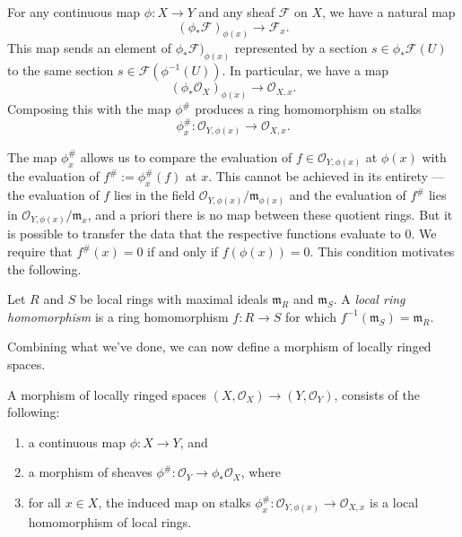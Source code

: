 For any continuous map \(\phi \colon X \to Y\) and any sheaf \(\mathcal{F}\) on \(X\), we have a natural map
\[ (\phi_{*} \mathcal{F})_{\phi(x)} \to \mathcal{F}_x.\]
This map sends an element of \(\phi_{*} \mathcal{F})_{\phi(x)}\) represented by a section \(s \in \phi_{*} \mathcal{F} (U)\) to the same section \(s \in \mathcal{F}(\phi^{-1}(U))\).
In particular, we have a map
\begin{equation}
(\phi_\ast \mathcal{O}_X)_{\phi(x)}  	\to 	\mathcal{O}_{X,x}. \label{FirstStalkMap}
\end{equation}
Composing this with the map $\phi^\#$ produces a ring homomorphism on stalks
\[\phi_x^\# : \mathcal{O}_{Y,\phi(x)} \to \mathcal{O}_{X,x}.\] 

The map \(\phi_x^{\#}\) allows us to compare the evaluation of \(f \in \mathcal{O}_{Y, \phi(x)}\) at \(\phi(x)\) with the evaluation of \(f^{\#} := \phi_x^{\#}(f)\) at \(x\).
This cannot be achieved in its entirety --- the evaluation of \(f\) lies in the field \(\mathcal{O}_{Y, \phi(x)}/ \mathfrak m_{\phi (x)}\) and the evaluation of \(f^{\#}\) lies in \(\mathcal{O}_{Y, \phi(x)}/ \mathfrak m_x\), and a priori there is no map between these quotient rings.
But it is possible to transfer the data that the respective functions evaluate to \(0\).
We require that \(f^{\#}(x) = 0\) if and only if \(f(\phi(x)) = 0\).
This condition motivates the following.
\begin{definition}
  Let \(R\) and \(S\) be local rings with maximal ideals \(\mathfrak{m}_R\) and \(\mathfrak{m}_{S}\).
A \emph{local ring homomorphism} is a ring homomorphism $f: R \to S$ for which $f^{-1}(\mathfrak{m}_S) = \mathfrak{m}_R$.
\end{definition}

Combining what we've done, we can now define a morphism of locally ringed spaces.

\begin{definition}
A morphism of locally ringed spaces $(X,\mathcal{O}_X) \to (Y,\mathcal{O}_Y)$, consists of the following:
\begin{enumerate}
\item a continuous map $\phi : X \to Y$, and
\item a morphism of sheaves $\phi^\# : \mathcal{O}_Y \to \phi_\ast\mathcal{O}_X$, where
\item for all $x \in X$, the induced map on stalks $\phi_x^\# : \mathcal{O}_{Y,\phi(x)} \to \mathcal{O}_{X,x}$ is a local homomorphism of local rings.
\end{enumerate}
\end{definition}

